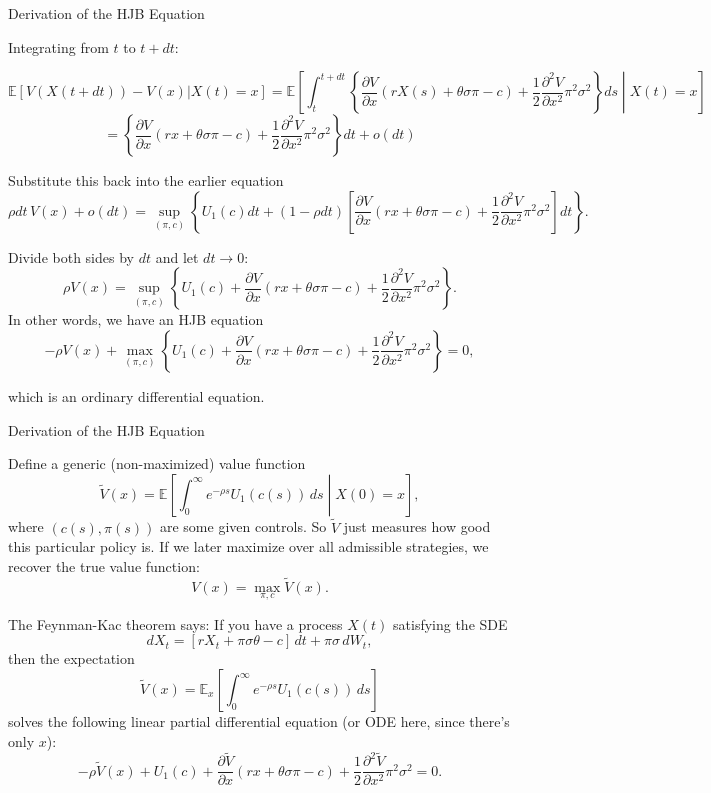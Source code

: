 \documentclass{beamer}
\begin{document}
\begin{frame}{Derivation of the HJB Equation}


    {\footnotesize \footnotesize
       Integrating from \( t \) to \( t + dt \):

    {\footnotesize \tiny
    \[
    \mathbb{E}[V(X(t + dt)) - V(x)|X(t) = x] 
     = \mathbb{E}\left[\int_t^{t+dt} \left\{ \frac{\partial V}{\partial x}(rX(s) + \theta\sigma\pi - c) + 
     \frac{1}{2} \frac{\partial^2 V}{\partial x^2} \pi^2\sigma^2 \right\} ds \middle| X(t) = x\right]
\]
\[
= \left\{ \frac{\partial V}{\partial x}(rx + \theta\sigma\pi - c) + 
\frac{1}{2} \frac{\partial^2 V}{\partial x^2} \pi^2\sigma^2 \right\} dt + o(dt)
    \]
    }
    \par  \pause Substitute this back into the earlier equation
     {\footnotesize \tiny
\[
\rho dt \, V(x) + o(dt) = \sup_{(\pi, c)} \left\{ U_1(c)dt + (1 - \rho dt) 
\left[ \frac{\partial V}{\partial x}(rx + \theta\sigma\pi - c) + 
\frac{1}{2} \frac{\partial^2 V}{\partial x^2}\pi^2\sigma^2 \right] dt \right\}.
\]
    }
    

Divide both sides by \( dt \) and let \( dt \to 0 \):
 {\footnotesize \tiny
\[
\rho V(x) = \sup_{(\pi, c)} \left\{ U_1(c) + \frac{\partial V}{\partial x}(rx + \theta\sigma\pi - c) 
+ \frac{1}{2} \frac{\partial^2 V}{\partial x^2}\pi^2\sigma^2 \right\}.
\]
    }
 \pause In other words, we have an HJB equation
 {\footnotesize \tiny
\[
- \rho V(x) + \max_{(\pi,c)} \left\{ U_1(c) + \frac{\partial V}{\partial x} (rx + \theta \sigma \pi - c) 
+ \frac{1}{2} \frac{\partial^2 V}{\partial x^2} \pi^2 \sigma^2 \right\} = 0,
\]
    }

which is an ordinary differential equation.
    }
\end{frame}


\begin{frame}{Derivation of the HJB Equation}


    {\footnotesize \footnotesize
    Define a generic (non-maximized) value function  
     {\footnotesize \tiny
    \[
    \tilde{V}(x) = \mathbb{E} \left[ \int_{0}^{\infty} e^{-\rho s} U_1(c(s)) \, ds \middle| X(0) = x \right],
    \]
    }
    where \((c(s), \pi(s))\) are some given controls. So \(\tilde{V}\) just measures how good this particular policy is.
    If we later maximize over all admissible strategies, we recover the true value function:  
\[
V(x) = \max_{\pi,c} \tilde{V}(x).
\]
\par  \pause The Feynman-Kac theorem says:  
If you have a process \(X(t)\) satisfying the SDE  
\[
dX_t = [rX_t + \pi\sigma\theta - c] \, dt + \pi\sigma \, dW_t,
\]
then the expectation  
\[
\tilde{V}(x) = \mathbb{E}_x \left[ \int_{0}^{\infty} e^{-\rho s} U_1(c(s)) \, ds \right]
\]
solves the following linear partial differential equation (or ODE here, since there's only \(x\)):  
\[
-\rho \tilde{V}(x) + U_1(c) + \frac{\partial \tilde{V}}{\partial x} (rx + \theta \sigma \pi - c) + \frac{1}{2} \frac{\partial^2 \tilde{V}}{\partial x^2} \pi^2 \sigma^2 = 0.
\]
        }
    \end{frame}
\end{document}
